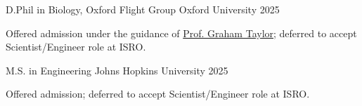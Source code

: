 
\begin{cventries}
  \cventry
  {D.Phil in Biology, Oxford Flight Group} %
  {Oxford University} %
  {} %
  {2025} %
  {
    \begin{cvitems}
      \item Offered admission under the guidance of \href{https://www.jesus.ox.ac.uk/about-jesus-college/our-community/people/professor-graham-taylor/}{Prof. Graham Taylor}; deferred to accept Scientist/Engineer role at ISRO.
    \end{cvitems}
  }

  \cventry
  {M.S. in Engineering} %
  {Johns Hopkins University} %
  {} %
  {2025} %
  {
    \begin{cvitems}
      \item Offered admission; deferred to accept Scientist/Engineer role at ISRO.
    \end{cvitems}
  }
\end{cventries}


